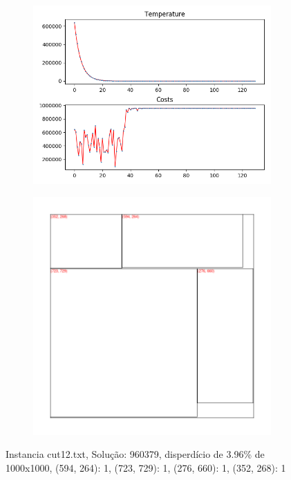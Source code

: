 
\begin{figure}
\centering
\begin{subfigure}{.5\textwidth}
  \centering
  \includegraphics[width=1\linewidth]{results/cut12/2/plot}
  \label{fig:sub1}
\end{subfigure}%
\begin{subfigure}{.5\textwidth}
  \centering
  \includegraphics[width=1\linewidth]{results/cut12/2/cut}
  \label{fig:sub2}
\end{subfigure}
\caption{Instancia cut12.txt, Solução: 960379, disperdício de 3.96\% de 1000x1000, {(594, 264): 1, (723, 729): 1, (276, 660): 1, (352, 268): 1}}
\label{fig:test}
\end{figure}


